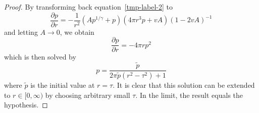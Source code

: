 \begin{proof}
	By transforming back equation~\ref{tmp-label-2} to
	\begin{equation}
		\frac{\partial p}{\partial r} = -\frac{1}{r^2}\left(Ap^{1/\gamma}+p\right)\left(4\pi r^3 p+vA\right)\left(1-2vA\right)^{-1}
		\label{eq:99-App-TOV-No-Mass-TOV-Eq-Normal}
	\end{equation}
	and letting $A\rightarrow0$, we obtain
	\begin{equation}
		\frac{\partial p}{\partial r} = - 4\pi rp^2
		\label{eq:99-App-TOV-No-Mass-TOV-Eq-No-Mass}
	\end{equation}
	which is then solved by
	\begin{equation}
		p = \frac{\tilde{p}}{2\pi\tilde{p}(r^2-\tau^2)+1}
		\label{eq:99-App-TOV-No-Mass-Sol-1}
	\end{equation}
	where $\tilde{p}$ is the initial value at $r=\tau$.
	It is clear that this solution can be extended to $r\in[0,\infty)$ by choosing arbitrary small $\tau$.
	In the limit, the result equals the hypothesis.
\end{proof}
%
%
%
